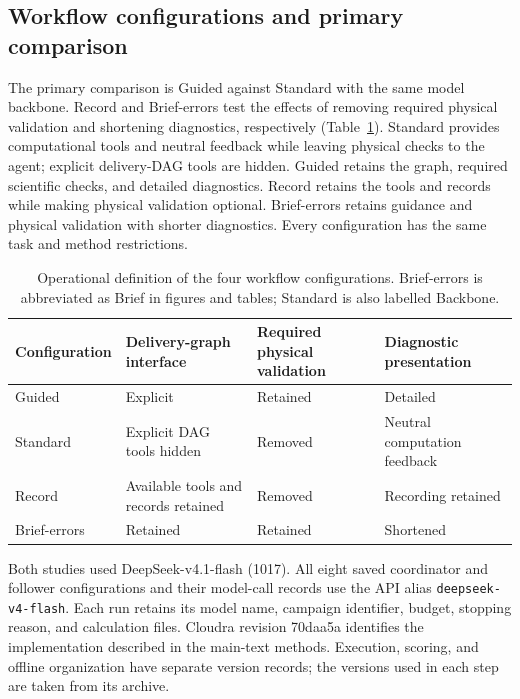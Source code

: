\subsection{Workflow configurations and primary comparison}
The primary comparison is Guided against Standard with the same model backbone. Record and Brief-errors test the effects of removing required physical validation and shortening diagnostics, respectively (Table~\ref{tab:si-configurations}). Standard provides computational tools and neutral feedback while leaving physical checks to the agent; explicit delivery-DAG tools are hidden. Guided retains the graph, required scientific checks, and detailed diagnostics. Record retains the tools and records while making physical validation optional. Brief-errors retains guidance and physical validation with shorter diagnostics. Every configuration has the same task and method restrictions.

\begin{table}[htbp]
\centering
\caption{Operational definition of the four workflow configurations. Brief-errors is abbreviated as Brief in figures and tables; Standard is also labelled Backbone.}
\label{tab:si-configurations}
\small
\begin{tabular}{p{}p{}p{}p{}}
\toprule
Configuration & Delivery-graph interface & Required physical validation & Diagnostic presentation \\
\midrule
Guided & Explicit & Retained & Detailed \\
Standard & Explicit DAG tools hidden & Removed & Neutral computation feedback \\
Record & Available tools and records retained & Removed & Recording retained \\
Brief-errors & Retained & Retained & Shortened \\
\bottomrule
\end{tabular}
\end{table}

Both studies used DeepSeek-v4.1-flash (1017). All eight saved coordinator and follower configurations and their model-call records use the API alias \texttt{deepseek-v4-flash}.\citep{deepseekv42026} Each run retains its model name, campaign identifier, budget, stopping reason, and calculation files. Cloudra revision 70daa5a identifies the implementation described in the main-text methods.\citep{ref14} Execution, scoring, and offline organization have separate version records; the versions used in each step are taken from its archive.

